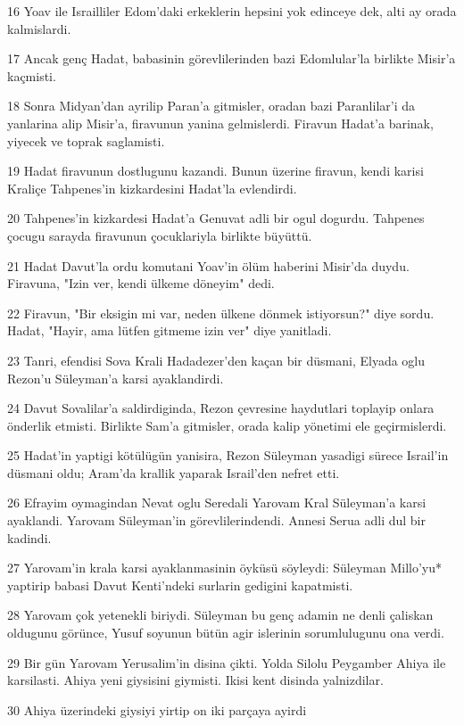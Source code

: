 \par 16 Yoav ile Israilliler Edom'daki erkeklerin hepsini yok edinceye dek, alti ay orada kalmislardi.
\par 17 Ancak genç Hadat, babasinin görevlilerinden bazi Edomlular'la birlikte Misir'a kaçmisti.
\par 18 Sonra Midyan'dan ayrilip Paran'a gitmisler, oradan bazi Paranlilar'i da yanlarina alip Misir'a, firavunun yanina gelmislerdi. Firavun Hadat'a barinak, yiyecek ve toprak saglamisti.
\par 19 Hadat firavunun dostlugunu kazandi. Bunun üzerine firavun, kendi karisi Kraliçe Tahpenes'in kizkardesini Hadat'la evlendirdi.
\par 20 Tahpenes'in kizkardesi Hadat'a Genuvat adli bir ogul dogurdu. Tahpenes çocugu sarayda firavunun çocuklariyla birlikte büyüttü.
\par 21 Hadat Davut'la ordu komutani Yoav'in ölüm haberini Misir'da duydu. Firavuna, "Izin ver, kendi ülkeme döneyim" dedi.
\par 22 Firavun, "Bir eksigin mi var, neden ülkene dönmek istiyorsun?" diye sordu. Hadat, "Hayir, ama lütfen gitmeme izin ver" diye yanitladi.
\par 23 Tanri, efendisi Sova Krali Hadadezer'den kaçan bir düsmani, Elyada oglu Rezon'u Süleyman'a karsi ayaklandirdi.
\par 24 Davut Sovalilar'a saldirdiginda, Rezon çevresine haydutlari toplayip onlara önderlik etmisti. Birlikte Sam'a gitmisler, orada kalip yönetimi ele geçirmislerdi.
\par 25 Hadat'in yaptigi kötülügün yanisira, Rezon Süleyman yasadigi sürece Israil'in düsmani oldu; Aram'da krallik yaparak Israil'den nefret etti.
\par 26 Efrayim oymagindan Nevat oglu Seredali Yarovam Kral Süleyman'a karsi ayaklandi. Yarovam Süleyman'in görevlilerindendi. Annesi Serua adli dul bir kadindi.
\par 27 Yarovam'in krala karsi ayaklanmasinin öyküsü söyleydi: Süleyman Millo'yu* yaptirip babasi Davut Kenti'ndeki surlarin gedigini kapatmisti.
\par 28 Yarovam çok yetenekli biriydi. Süleyman bu genç adamin ne denli çaliskan oldugunu görünce, Yusuf soyunun bütün agir islerinin sorumlulugunu ona verdi.
\par 29 Bir gün Yarovam Yerusalim'in disina çikti. Yolda Silolu Peygamber Ahiya ile karsilasti. Ahiya yeni giysisini giymisti. Ikisi kent disinda yalnizdilar.
\par 30 Ahiya üzerindeki giysiyi yirtip on iki parçaya ayirdi
